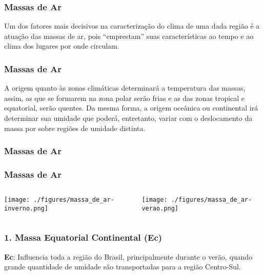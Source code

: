 \begin{frame}
  \frametitle{Massas de Ar}
  \begin{block}{}
    Um dos fatores mais decisivos na caracterização do clima de uma dada região
    é a atuação das massas de ar, pois ``emprestam'' suas características ao
    tempo e ao clima dos lugares por onde circulam.
  \end{block}
\end{frame}

\begin{frame}
  \frametitle{Massas de Ar}
  \begin{block}{}
    A origem quanto às zonas climáticas determinará a temperatura das massas,
    assim, as que se formarem na zona polar serão frias e as das zonas tropical
    e equatorial, serão quentes.  Da mesma forma, a origem oceânica ou
    continental irá determinar sua umidade que poderá, entretanto, variar com o
    deslocamento da massa por sobre regiões de umidade distinta.
  \end{block}
\end{frame}

\begin{frame}
  \frametitle{Massas de Ar}
  \begin{center}
  \end{center}
\end{frame}

\begin{frame}
  \frametitle{Massas de Ar}
    \begin{columns}
        \begin{column}{0.5\textwidth}
    \begin{center}
        \texttt{[image: ./figures/massa\_de\_ar-inverno.png]}
    \end{center}
        \end{column}
    \begin{column}{0.5\textwidth}
    \begin{center}
        \texttt{[image: ./figures/massa\_de\_ar-verao.png]}
    \end{center}
    \end{column}
    \end{columns}
\end{frame}


\begin{frame}
  \frametitle{1. Massa Equatorial Continental (Ec)}
  {\scriptsize
  \begin{block}{}
    {\bf Ec}: Influencia toda a região do Brasil, principalmente durante o
    verão, quando grande quantidade de umidade são transportadas para a região
    Centro-Sul.
  \end{block}
  }
  \begin{center}
  \end{center}
\end{frame}


